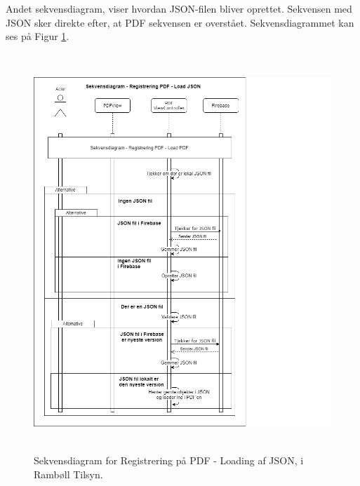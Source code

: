 Andet sekvensdiagram, viser hvordan JSON-filen bliver oprettet. Sekvensen med JSON sker direkte efter, at PDF sekvensen er overstået. Sekvensdiagrammet kan ses på Figur \ref{fig:LoadJSONSekvensDiagram}.
\begin{figure}[H] %
	\centering
	\includegraphics[height=15cm, width=15cm]{Design/Applikation/RegistrePDF/LoadJSONSekvensDiagram}
	\caption{Sekvensdiagram for Registrering på PDF - Loading af JSON, i Rambøll Tilsyn.}
	\label{fig:LoadJSONSekvensDiagram}
\end{figure}

\clearpage

